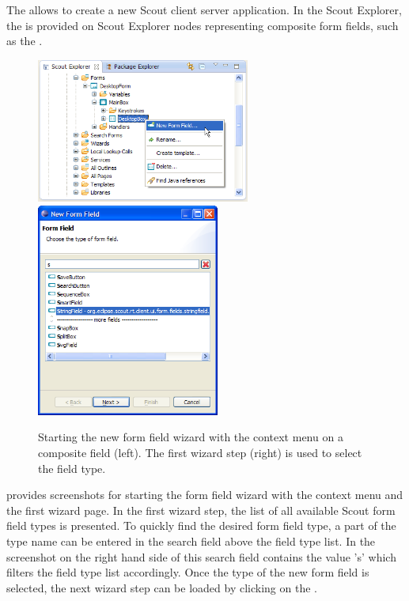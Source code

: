 \documentclass[a4paper,10pt,twoside]{book}
\begin{document}
The  allows to create a new Scout client server application. 
In the Scout Explorer, the  is provided on Scout Explorer nodes representing composite form fields, such as the . 

\begin{figure}
\includegraphics[width=7cm]{wizard_field_contextmenu.png} \hspace{5mm}
\includegraphics[width=6cm]{wizard_field_1.png}
\caption{Starting the new form field wizard with the context menu on a composite field (left). The first wizard step (right) is used to select the field type.}
\end{figure}

 provides screenshots for starting the form field wizard with the context menu and the first wizard page. 
In the first wizard step, the list of all available Scout form field types is presented. 
To quickly find the desired form field type, a part of the type name can be entered in the search field above the field type list. 
In the screenshot on the right hand side of  this search field contains the value 's' which filters the field type list accordingly. 
Once the type of the new form field is selected, the next wizard step can be loaded by clicking on the .
\end{document}
